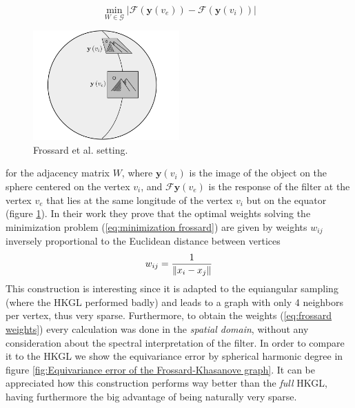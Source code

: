 \begin{equation}\label{eq:minimization frossard}
	\min_{W\in\mathcal G} \left|\mathcal{F}\left(\mathbf{y}\left(v_{ e}\right)\right)-\mathcal{F}\left(\mathbf{y}\left(v_{ i}\right)\right)\right|
\end{equation}
\begin{figure}
	\begin{center}
		\includegraphics[width=0.5\textwidth]{figs/Chapter3/frossard2.png}
	\end{center}
	\caption{\label{fig:frossard2}Frossard et al. setting.}
\end{figure}
for the adjacency matrix $W$, where $\mathbf y(v_i)$ is the image of the object on the sphere centered on the vertex $v_i$, and $\mathcal F \mathbf y(v_e)$ is the response of the filter at the vertex $v_e$ that lies at the same longitude of the vertex $v_i$ but on the equator (figure \ref{fig:frossard2}). In their work they prove that the optimal weights solving the minimization problem (\ref{eq:minimization frossard}) are given by weights $w_{ij}$ inversely proportional to the Euclidean distance between vertices
\begin{equation}\label{eq:frossard weights}
	w_{ij} = \frac{1}{\left\lVert x_i-x_j\right\rVert}
\end{equation}
This construction is interesting since it is adapted to the equiangular sampling (where the HKGL performed badly) and leads to a graph with only 4 neighbors per vertex, thus very sparse. Furthermore, to obtain the weights (\ref{eq:frossard weights}) every calculation was done in the \textit{spatial domain}, without any consideration about the spectral interpretation of the filter. In order to compare it to the HKGL we show the equivariance error by spherical harmonic degree in figure \ref{fig:Equivariance error of the Frossard-Khasanove graph}. It can be appreciated how this construction performs way better than the \textit{full} HKGL, having furthermore the big advantage of being naturally very sparse.
